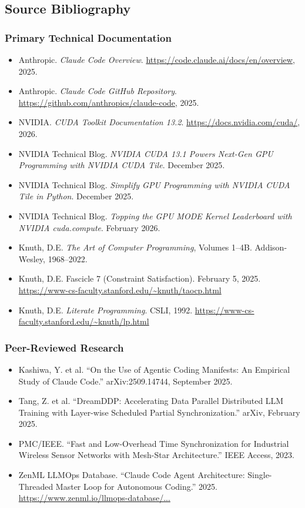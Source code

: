 \documentclass[11pt,letterpaper]{article}
\begin{document}
\subsection{Source Bibliography}

\subsubsection{Primary Technical Documentation}
\begin{itemize}[leftmargin=1.5em]
  \item Anthropic. \textit{Claude Code Overview}. \url{https://code.claude.ai/docs/en/overview}, 2025.
  \item Anthropic. \textit{Claude Code GitHub Repository}. \url{https://github.com/anthropics/claude-code}, 2025.
  \item NVIDIA. \textit{CUDA Toolkit Documentation 13.2}. \url{https://docs.nvidia.com/cuda/}, 2026.
  \item NVIDIA Technical Blog. \textit{NVIDIA CUDA 13.1 Powers Next-Gen GPU Programming with NVIDIA CUDA Tile}. December 2025.
  \item NVIDIA Technical Blog. \textit{Simplify GPU Programming with NVIDIA CUDA Tile in Python}. December 2025.
  \item NVIDIA Technical Blog. \textit{Topping the GPU MODE Kernel Leaderboard with NVIDIA cuda.compute}. February 2026.
  \item Knuth, D.E. \textit{The Art of Computer Programming}, Volumes 1--4B. Addison-Wesley, 1968--2022.
  \item Knuth, D.E. Fascicle 7 (Constraint Satisfaction). February 5, 2025. \url{https://www-cs-faculty.stanford.edu/~knuth/taocp.html}
  \item Knuth, D.E. \textit{Literate Programming}. CSLI, 1992. \url{https://www-cs-faculty.stanford.edu/~knuth/lp.html}
\end{itemize}

\subsubsection{Peer-Reviewed Research}
\begin{itemize}[leftmargin=1.5em]
  \item Kashiwa, Y. et al. ``On the Use of Agentic Coding Manifests: An Empirical Study of Claude Code.'' arXiv:2509.14744, September 2025.
  \item Tang, Z. et al. ``DreamDDP: Accelerating Data Parallel Distributed LLM Training with Layer-wise Scheduled Partial Synchronization.'' arXiv, February 2025.
  \item PMC/IEEE. ``Fast and Low-Overhead Time Synchronization for Industrial Wireless Sensor Networks with Mesh-Star Architecture.'' IEEE Access, 2023.
  \item ZenML LLMOps Database. ``Claude Code Agent Architecture: Single-Threaded Master Loop for Autonomous Coding.'' 2025. \url{https://www.zenml.io/llmops-database/...}
\end{itemize}
\end{document}
